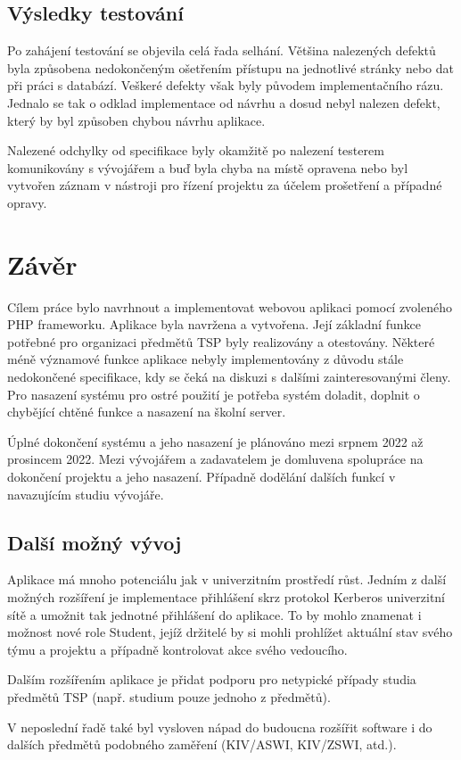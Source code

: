 \documentclass[czech,BP]{thesiskiv}
\begin{document}
	\section{Výsledky testování}
	\par Po zahájení testování se objevila celá řada selhání. Většina nalezených defektů byla způsobena nedokončeným ošetřením přístupu na jednotlivé stránky nebo  dat při práci s databází. Veškeré defekty však byly původem implementačního rázu. Jednalo se tak o odklad implementace od návrhu a dosud nebyl nalezen defekt, který by byl způsoben chybou návrhu aplikace.
	\par Nalezené odchylky od specifikace byly okamžitě po nalezení testerem komunikovány s vývojářem a buď byla chyba na místě opravena nebo byl vytvořen záznam v nástroji pro řízení projektu za účelem prošetření a případné opravy.  
\chapter{Závěr}
	\par Cílem práce bylo navrhnout a implementovat webovou aplikaci pomocí zvoleného PHP frameworku. Aplikace byla navržena a vytvořena. Její základní funkce potřebné pro organizaci předmětů TSP byly realizovány a otestovány. Některé méně významové funkce aplikace nebyly implementovány z důvodu stále nedokončené specifikace, kdy se čeká na diskuzi s dalšími zainteresovanými členy. Pro nasazení systému pro ostré použití je potřeba systém doladit, doplnit o chybějící chtěné funkce a nasazení na školní server. 

	\par Úplné dokončení systému a jeho nasazení je plánováno mezi srpnem 2022 až prosincem 2022. Mezi vývojářem a zadavatelem je domluvena spolupráce na dokončení projektu a jeho nasazení. Případně dodělání dalších funkcí v navazujícím studiu vývojáře.
	\section{Další možný vývoj}
	\par Aplikace má mnoho potenciálu jak v univerzitním prostředí růst. Jedním z další možných rozšíření je implementace přihlášení skrz protokol Kerberos univerzitní sítě a umožnit tak jednotné přihlášení do aplikace. To by mohlo znamenat i možnost nové role Student, jejíž držitelé by si mohli prohlížet aktuální stav svého týmu a projektu a případně kontrolovat akce svého vedoucího.
	\par Dalším rozšířením aplikace je přidat podporu pro netypické případy studia předmětů TSP (např. studium pouze jednoho z předmětů).
	\par V neposlední řadě také byl vysloven nápad do budoucna rozšířit software i do dalších předmětů podobného zaměření (KIV/ASWI, KIV/ZSWI, atd.).
\listoffigures
%
%
\lstlistoflistings

% 
%

{\raggedright\small

}
\end{document}
